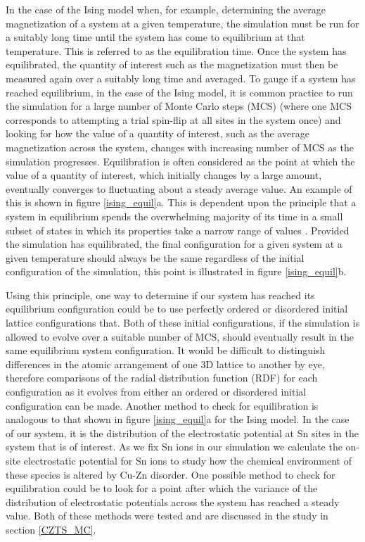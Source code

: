 \documentclass[11pt, twoside]{report}
\begin{document}
In the case of the Ising model when, for example, determining the average magnetization of a system at a given temperature, the simulation must be run for a suitably long time until the system has come to equilibrium at that temperature. This is referred to as the equilibration time. Once the system has equilibrated, the quantity of interest such as the magnetization must then be measured again over a suitably long time and averaged. 
To gauge if a system has reached equilibrium, in the case of the Ising model, it is common practice to run the simulation for a large number of Monte Carlo steps (MCS) (where one MCS corresponds to attempting a trial spin-flip at all sites in the system once) and looking for how the value of a quantity of interest, such as the average magnetization across the system, changes with increasing number of MCS as the simulation progresses. Equilibration is often considered as the point at which the value of a quantity of interest, which initially changes by a large amount, eventually converges to fluctuating about a steady average value. An example of this is shown in figure \ref{ising_equil}a. This is dependent upon the principle that a system in equilibrium spends the overwhelming majority of its time in a small subset of states in which its properties take a narrow range of values \cite{MC}. Provided the simulation has equilibrated, the final configuration for a given system at a given temperature should always be the same regardless of the initial configuration of the simulation, this point is illustrated in figure \ref{ising_equil}b.

Using this principle, one way to determine if our system has reached its equilibrium configuration could be to use perfectly ordered or disordered initial lattice configurations that. Both of these initial configurations, if the simulation is allowed to evolve over a suitable number of MCS, should eventually result in the same equilibrium system configuration. It would be difficult to distinguish differences in the atomic arrangement of one 3D lattice to another by eye, therefore comparisons of the radial distribution function (RDF) for each configuration as it evolves from either an ordered or disordered initial configuration can be made. 
Another method to check for equilibration is analogous to that shown in figure \ref{ising_equil}a for the Ising model. In the case of our system, it is the distribution of the electrostatic potential at Sn sites in the system that is of interest. As we fix Sn ions in our simulation we calculate the on-site electrostatic potential for Sn ions to study how the chemical environment of these species is altered by Cu-Zn disorder. One possible method to check for equilibration could be to look for a point after which the variance of the distribution of electrostatic potentials across the system has reached a steady value. Both of these methods were tested and are discussed in the study in section \ref{CZTS_MC}.
\end{document}
